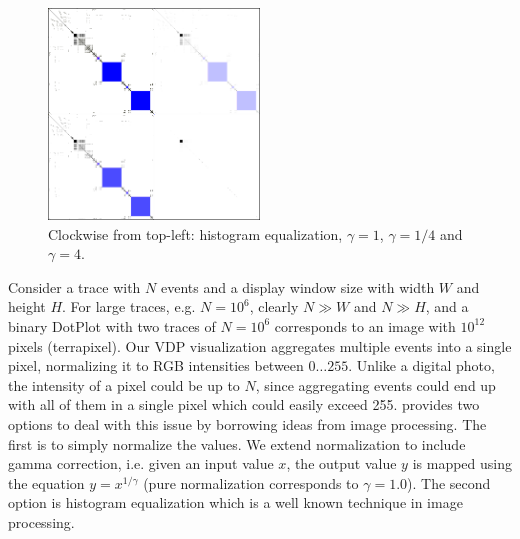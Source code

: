 \begin{figure}[tb]
\begin{center}
\includegraphics[width=0.5\textwidth]{lviz/gamma.png}
\caption{Clockwise from top-left:
histogram equalization, $\gamma=1$,
$\gamma=1/4$ and $\gamma=4$.
}
\label{fig:gamma}
\end{center}
\end{figure}

Consider a trace with $N$ events and
a display window size with width $W$ and height $H$.
For large traces, e.g. $N=10^6$, clearly $N \gg W$ and $N \gg H$,
and a binary DotPlot with two traces of $N=10^6$ corresponds to an
image with $10^{12}$ pixels (terrapixel).
Our VDP visualization aggregates multiple events into a single pixel,
normalizing it to RGB intensities between $0\ldots255$.
Unlike a digital photo, the intensity of a pixel could be up to $N$,
since aggregating events could end up with all of them
in a single pixel which could easily exceed 255.
 provides two options to deal with this issue by borrowing 
ideas from image processing.
The first is to simply normalize the values.
We extend normalization to include gamma correction, i.e. given an input value $x$,
the output value $y$ is mapped using the equation $y=x^{1/\gamma}$
(pure normalization corresponds to $\gamma = 1.0$).
The second option is histogram equalization which is
a well known technique in image processing.



